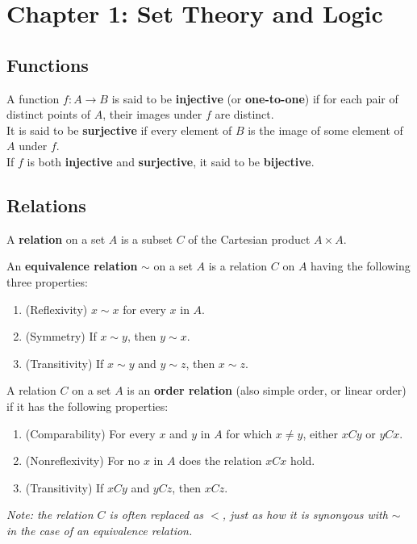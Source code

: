\section{Chapter 1: Set Theory and Logic}

\setcounter{subsection}{1}
\subsection{Functions}

\begin{definition}
A function $f \colon A \rightarrow B$ is said to be \textbf{injective} (or \textbf{one-to-one}) if for each pair of distinct points of $A$, their images under $f$ are distinct. \\

It is said to be \textbf{surjective} if every element of $B$ is the image of some element of $A$ under $f$. \\

If $f$ is both \textbf{injective} and \textbf{surjective}, it said to be \textbf{bijective}.
\end{definition}

\subsection{Relations}

\begin{definition}[Relation]
A \textbf{relation} on a set $A$ is a subset $C$ of the Cartesian product $A \times A$. 
\end{definition}

\begin{definition}
An \textbf{equivalence relation} $\sim$ on a set $A$ is a relation $C$ on $A$ having the following three properties:
\begin{enumerate}
    \item (Reflexivity) $x \sim x$ for every $x$ in $A$.
    \item (Symmetry) If $x \sim y$, then $y \sim x$.
    \item (Transitivity) If $x \sim y$ and $y \sim z$, then $x \sim z$.
\end{enumerate}    
\end{definition}

\begin{definition}\label{simple_order_relation}
    A relation $C$ on a set $A$ is an \textbf{order relation} (also simple order, or linear order) if it has the following properties: 
    \begin{enumerate}
        \item (Comparability) For every $x$ and $y$ in $A$ for which $x \neq y$, either $xCy$ or $yCx$.
        \item (Nonreflexivity) For no $x$ in $A$ does the relation $xCx$ hold.
        \item (Transitivity) If $xCy$ and $yCz$, then $xCz$.
    \end{enumerate}    
    \textit{Note: the relation $C$ is often replaced as $<$, just as how it is synonyous with $\sim$ in the case of an equivalence relation.}
\end{definition}

